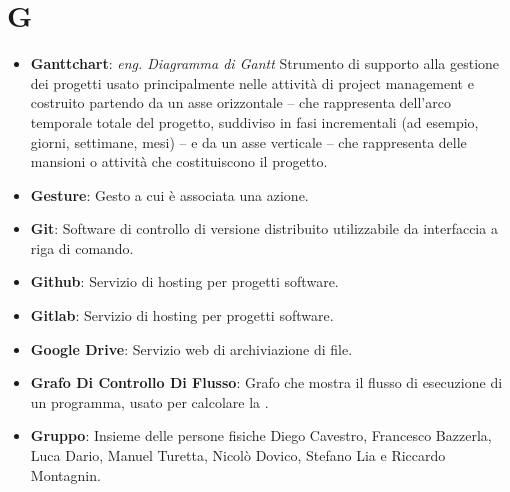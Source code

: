 \section{G}
\begin{itemize}
	\item
	\textbf{Ganttchart}: \textit{eng. Diagramma di Gantt} Strumento di supporto alla gestione dei progetti usato principalmente nelle attività di project management e costruito partendo da un asse orizzontale -- che rappresenta dell'arco temporale totale del progetto, suddiviso in fasi incrementali (ad esempio, giorni, settimane, mesi) -- e da un asse verticale -- che rappresenta delle mansioni o attività che costituiscono il progetto.
	\item
	\textbf{Gesture}: Gesto a cui è associata una azione.
	\item
	\textbf{Git}: Software di controllo di versione distribuito utilizzabile da interfaccia a riga di comando.
	\item
	\textbf{Github}: Servizio di hosting per progetti software.
	\item
	\textbf{Gitlab}: Servizio di hosting per progetti software.
	\item
	\textbf{Google Drive}: Servizio web di archiviazione di file.
	\item
	\textbf{Grafo Di Controllo Di Flusso}: Grafo che mostra il flusso di esecuzione di un programma, usato per calcolare la .
	\item
	\textbf{Gruppo}: Insieme delle persone fisiche Diego Cavestro, Francesco Bazzerla, Luca Dario, Manuel Turetta, Nicolò Dovico, Stefano Lia e Riccardo Montagnin.
\end{itemize}
\newpage